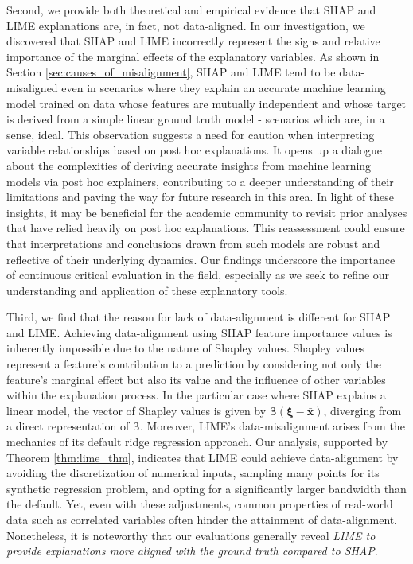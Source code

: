\documentclass[12pt]{article}  %
\begin{document}
       Second, we provide both theoretical and empirical evidence that SHAP and LIME explanations are, in fact, not data-aligned. In our investigation, we discovered that SHAP and LIME incorrectly represent the signs and relative importance of the marginal effects of the explanatory variables. As shown in Section \ref{sec:causes_of_misalignment}, SHAP and LIME tend to be data-misaligned even in scenarios where they explain an accurate machine learning model trained on data whose features are mutually independent and whose target is derived from a simple linear ground truth model - scenarios which are, in a sense, ideal. This observation suggests a need for caution when interpreting variable relationships based on post hoc explanations. It opens up a dialogue about the complexities of deriving accurate insights from machine learning models via post hoc explainers, contributing to a deeper understanding of their limitations and paving the way for future research in this area. In light of these insights, it may be beneficial for the academic community to revisit prior analyses that have relied heavily on post hoc explanations. This reassessment could ensure that interpretations and conclusions drawn from such models are robust and reflective of their underlying dynamics. Our findings underscore the importance of continuous critical evaluation in the field, especially as we seek to refine our understanding and application of these explanatory tools. 
        
        Third, we find that the reason for lack of data-alignment is different for SHAP and LIME. Achieving data-alignment using SHAP feature importance values is inherently impossible due to the nature of Shapley values. Shapley values represent a feature's contribution to a prediction by considering not only the feature's marginal effect but also its value and the influence of other variables within the explanation process. In the particular case where SHAP explains a linear model, the vector of Shapley values is given by $\boldsymbol{\beta}(\boldsymbol{\xi}-\bar{\mathbf{x}})$, diverging from a direct representation of $\boldsymbol{\beta}$. Moreover, LIME's data-misalignment arises from the mechanics of its default ridge regression approach. Our analysis, supported by Theorem \ref{thm:lime_thm}, indicates that LIME could achieve data-alignment by avoiding the discretization of numerical inputs, sampling many points for its synthetic regression problem, and opting for a significantly larger bandwidth than the default. Yet, even with these adjustments, common properties of real-world data such as correlated variables often hinder the attainment of data-alignment. Nonetheless, it is noteworthy that our evaluations generally reveal \textit{LIME to provide explanations more aligned with the ground truth compared to SHAP}.
 
\end{document}
